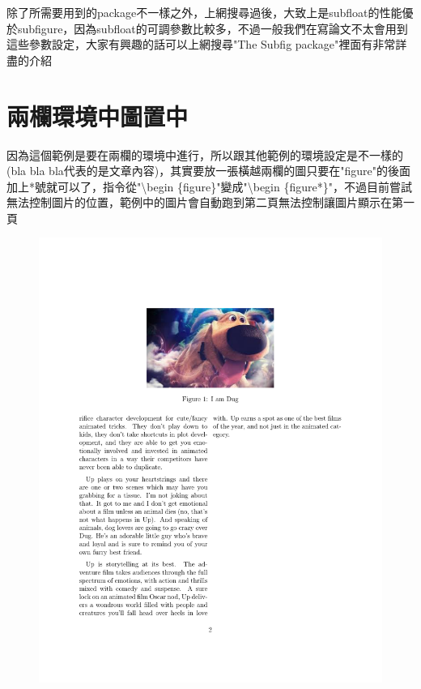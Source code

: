 \documentclass[12pt,a4paper]{report}
\begin{document}
\begin{CJK}{UTF8}{bkai}
\begin{itemize}
除了所需要用到的package不一樣之外，上網搜尋過後，大致上是subfloat的性能優於subfigure，因為subfloat的可調參數比較多，不過一般我們在寫論文不太會用到這些參數設定，大家有興趣的話可以上網搜尋"The Subfig package"裡面有非常詳盡的介紹
\end{itemize}

\section{兩欄環境中圖置中}
\noindent 因為這個範例是要在兩欄的環境中進行，所以跟其他範例的環境設定是不一樣的(bla bla bla代表的是文章內容)，其實要放一張橫越兩欄的圖只要在"figure"的後面加上*號就可以了，指令從"\textbackslash begin \{figure\}"變成"\textbackslash begin \{figure*\}"，不過目前嘗試無法控制圖片的位置，範例中的圖片會自動跑到第二頁無法控制讓圖片顯示在第一頁
\begin{figure}[!h] 
\begin{minipage}[b]{0.5\textwidth} 
\centering 
\includegraphics[scale=0.3]{./pics/twocolumn_figure_example.pdf} 

\end{minipage}
\end{figure}
\end{CJK}
\end{document}
